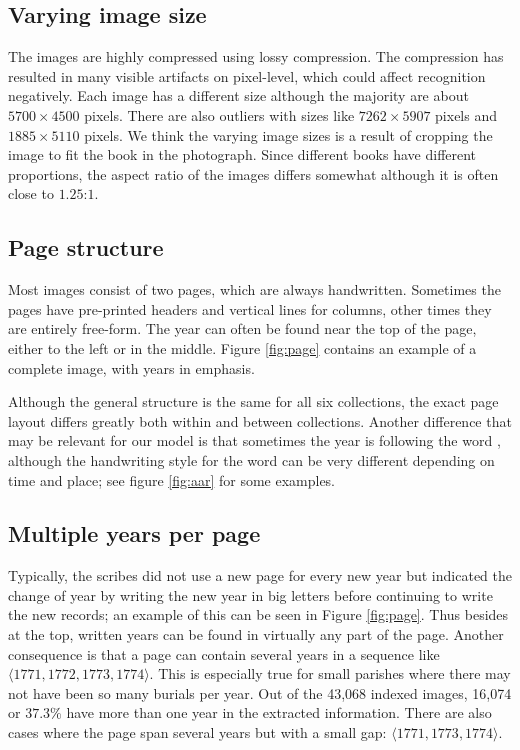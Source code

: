 \subsection{Varying image size}

The images are highly compressed using lossy compression. The compression has resulted in many visible artifacts on pixel-level, which could affect recognition negatively. Each image has a different size although the majority are about $5700 \times 4500$ pixels. There are also outliers with sizes like $7262 \times 5907$ pixels and $1885 \times 5110$ pixels. We think the varying image sizes is a result of cropping the image to fit the book in the photograph.
Since different books have different proportions, the aspect ratio of the images differs somewhat although it is often close to $1.25$:$1$.

\newpage
\subsection{Page structure}

Most images consist of two pages, which are always handwritten. Sometimes the pages have pre-printed headers and vertical lines for columns, other times they are entirely free-form.
The year can often be found near the top of the page, either to the left or in the middle. Figure \ref{fig:page} contains an example of a complete image, with years in emphasis.



Although the general structure is the same for all six collections, the exact page layout differs greatly both within and between collections. Another difference that may be relevant for our model is that sometimes the year is following the word , although the handwriting style for the word can be very different depending on time and place; see figure \ref{fig:aar} for some examples.


\subsection{Multiple years per page} \label{sssec:swe_multiyear}

Typically, the scribes did not use a new page for every new year but indicated the change of year by writing the new year in big letters before continuing to write the new records; an example of this can be seen in Figure \ref{fig:page}.
Thus besides at the top, written years can be found in virtually any part of the page. Another consequence is that a page can contain several years in a sequence like $\langle 1771, 1772, 1773, 1774 \rangle$. This is especially true for small parishes where there may not have been so many burials per year. Out of the 43,068 indexed images, 16,074 or $37.3\%$ have more than one year in the extracted information. There are also cases where the page span several years but with a small gap: $\langle 1771, 1773, 1774 \rangle$.

